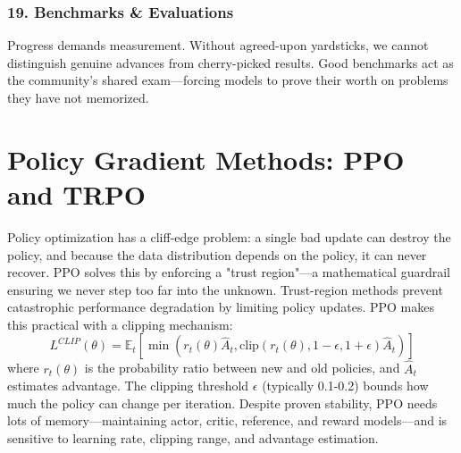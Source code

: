 \documentclass[12pt,a4paper]{report}
\theoremstyle{definition}
\begin{document}
\subsubsection*{19. Benchmarks \& Evaluations}
Progress demands measurement. Without agreed-upon yardsticks, we cannot distinguish genuine advances from cherry-picked results. Good benchmarks act as the community's shared exam---forcing models to prove their worth on problems they have not memorized.

\section{Policy Gradient Methods: PPO and TRPO}
\label{sec:ppo}
Policy optimization has a cliff-edge problem: a single bad update can destroy the policy, and because the data distribution depends on the policy, it can never recover. PPO solves this by enforcing a "trust region"—a mathematical guardrail ensuring we never step too far into the unknown. Trust-region methods prevent catastrophic performance degradation by limiting policy updates. PPO \cite{schulman2017ppo} makes this practical with a clipping mechanism:
\begin{equation}
L^{CLIP}(\theta) = \mathbb{E}_t \left[ \min(r_t(\theta) \hat{A}_t, \text{clip}(r_t(\theta), 1-\epsilon, 1+\epsilon) \hat{A}_t) \right]
\end{equation}
where $r_t(\theta)$ is the probability ratio between new and old policies, and $\hat{A}_t$ estimates advantage. The clipping threshold $\epsilon$ (typically 0.1-0.2) bounds how much the policy can change per iteration. Despite proven stability, PPO needs lots of memory---maintaining actor, critic, reference, and reward models---and is sensitive to learning rate, clipping range, and advantage estimation.
\end{document}
